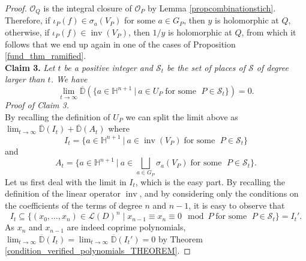 \documentclass[10pt]{amsart}
\DeclareMathOperator{\inv}{inv}
\newcommand{\vH}{\mathbb{H}}
\newcommand{\vD}{\mathbb{D}}
\newcommand{\cO}{\mathcal{O}}
\newcommand{\cS}{\mathcal{S}}
\newcommand{\cL}{\mathcal{L}}
\theoremstyle{definition}
\theoremstyle{remark}
\numberwithin{equation}{section}
\begin{document}
\begin{proof}
$\cO_Q$ is the integral closure of $\cO_P$ by Lemma \ref{propcombinationstich}. Therefore, if $\iota_P(f)\in \sigma_a(V_P)$ for some $a\in G_P$, then $y$ is holomorphic at $Q$, otherwise, if $\iota_P(f)\in \inv(V_P)$, then $1/y$ is holomorphic at $Q$, from which it follows that we end up again in one of the cases of Proposition \ref{fund_thm_ramified}.\\
\textbf{Claim 3.} \emph{Let $t$ be a positive integer and $\cS_t$ be the set of places of $\cS$ of degree larger than $t$. We have}
\[\lim_{t\rightarrow \infty }\overline{\vD}(\{a\in \vH^{n+1}\:|\: a\in U_P \;\text{for some }\; P\in \cS_t\})=0.\]
\emph{Proof of Claim 3.}\\
By recalling the definition of $U_P$ we can split the limit above as $\lim_{t\rightarrow \infty} \overline{\vD}(I_t)+\overline{\vD}(A_t)$ where
\[I_t=\{a\in \vH^{n+1}\:|\: a\in \inv(V_P) \;\text{for some }\; P\in \cS_t\}\]
and
\[A_t=\{a\in \vH^{n+1}\:|\: a\in \bigsqcup_{a\in G_P} \sigma_a(V_P) \;\text{for some }\; P\in \cS_t\}.\]
Let us first deal with the limit in $I_t$, which is the easy part.
By recalling the definition of the linear operator $\inv$, and by considering only the conditions on the coefficients of the terms of degree $n$ and $n-1$, it is easy to observe that 
\[I_t\subseteq \{(x_0,\dots, x_n)\in \cL(D)^n\;|\; x_{n-1}\equiv x_n\equiv 0 \mod P \;\text{for some }\; P\in \cS_t\}=I_t'.\]
As $x_n$ and $x_{n-1}$ are indeed coprime polynomials, $\lim_{t\rightarrow \infty} \overline{\vD}(I_t)=\lim_{t\rightarrow \infty} \overline{\vD}(I_t')=0$ by Theorem \ref{condition_verified_polynomials_THEOREM}.


\end{proof}
\end{document}
